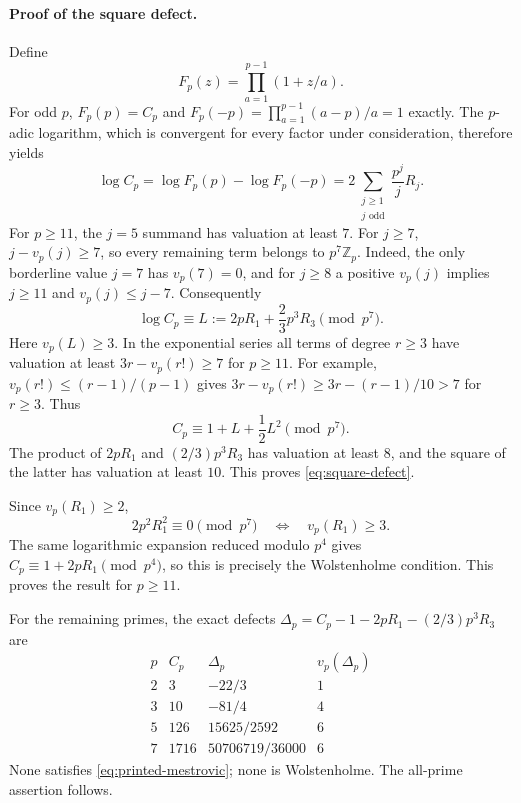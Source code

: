 \documentclass[11pt,a4paper]{article}
\theoremstyle{definition}
\theoremstyle{remark}
\begin{document}
\paragraph{Proof of the square defect.}
Define
\[
 F_p(z)=\prod_{a=1}^{p-1}(1+z/a).
\]
For odd $p$, $F_p(p)=C_p$ and
$F_p(-p)=\prod_{a=1}^{p-1}(a-p)/a=1$ exactly.
The $p$-adic logarithm, which is convergent for every factor under
consideration, therefore yields
\begin{equation}\label{eq:odd-log}
 \log C_p
 =\log F_p(p)-\log F_p(-p)
 =2\sum_{\substack{j\ge1\\j\text{ odd}}}\frac{p^j}{j}R_j.
\end{equation}
For $p\ge11$, the $j=5$ summand has valuation at least $7$.
For $j\ge7$, $j-v_p(j)\ge7$, so every remaining term belongs to
$p^7\mathbb Z_p$.  Indeed, the only borderline value $j=7$ has
$v_p(7)=0$, and for $j\ge8$ a positive $v_p(j)$ implies $j\ge11$ and
$v_p(j)\le j-7$.  Consequently
\[
 \log C_p\equiv L:=2pR_1+\frac23p^3R_3\pmod{p^7}.
\]
Here $v_p(L)\ge3$.  In the exponential series all terms of degree
$r\ge3$ have valuation at least $3r-v_p(r!)\ge7$ for $p\ge11$.
For example, $v_p(r!)\le(r-1)/(p-1)$ gives
$3r-v_p(r!)\ge3r-(r-1)/10>7$ for $r\ge3$.
Thus
\[
 C_p\equiv1+L+\frac12L^2\pmod{p^7}.
\]
The product of $2pR_1$ and $(2/3)p^3R_3$ has valuation at least $8$,
and the square of the latter has valuation at least $10$.  This proves
\eqref{eq:square-defect}.

Since $v_p(R_1)\ge2$,
\[
 2p^2R_1^2\equiv0\pmod{p^7}
 \quad\Longleftrightarrow\quad v_p(R_1)\ge3.
\]
The same logarithmic expansion reduced modulo $p^4$ gives
$C_p\equiv1+2pR_1\pmod{p^4}$, so this is precisely the Wolstenholme
condition.  This proves the result for $p\ge11$.

For the remaining primes, the exact defects
$\Delta_p=C_p-1-2pR_1-(2/3)p^3R_3$ are
\[
\begin{array}{c|c|c|c}
p& C_p&\Delta_p&v_p(\Delta_p)\\\hline
2&3&-22/3&1\\
3&10&-81/4&4\\
5&126&15625/2592&6\\
7&1716&50706719/36000&6
\end{array}
\]
None satisfies \eqref{eq:printed-mestrovic}; none is Wolstenholme.
The all-prime assertion follows.
\end{document}
